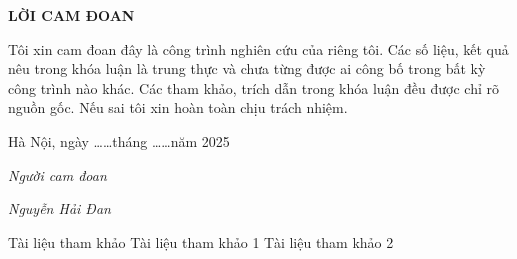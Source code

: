 \documentclass{uetgraduation}
\begin{document}
\newpage
\thispagestyle{empty}
\begin{center}
    \textbf{LỜI CAM ĐOAN}
\end{center}

Tôi xin cam đoan đây là công trình nghiên cứu của riêng tôi. Các số liệu, kết quả nêu trong khóa luận là trung thực và chưa từng được ai công bố trong bất kỳ công trình nào khác. Các tham khảo, trích dẫn trong khóa luận đều được chỉ rõ nguồn gốc. Nếu sai tôi xin hoàn toàn chịu trách nhiệm.

\begin{flushright}
    Hà Nội, ngày \ldots\ldots tháng \ldots\ldots năm 2025

    \vspace{2cm}
    \textit{Người cam đoan}

    \vspace{1cm}
    \textit{Nguyễn Hải Đan}
\end{flushright}







\begin{thebibliography}{99}
    \begin{bibsection}{Tài liệu tham khảo}
         Tài liệu tham khảo 1
         Tài liệu tham khảo 2
    \end{bibsection}
\end{thebibliography}
\end{document}

